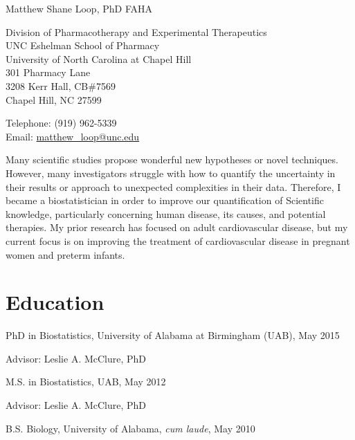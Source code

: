 \documentclass[10pt,letterpaper]{article}
\def\name{Matthew Shane Loop, PhD FAHA}
\renewenvironment{itemize}{
  \begin{list}{}{
    \setlength{\leftmargin}{1.5em}
    \setlength{\itemsep}{0.25em}
    \setlength{\parskip}{0pt}
    \setlength{\parsep}{0.25em}
  }
}{
  \end{list}
}
\begin{document}
{\Huge \name}


\bigskip

\begin{minipage}[t]{0.6\textwidth}
  Division of Pharmacotherapy and Experimental Therapeutics \\
  UNC Eshelman School of Pharmacy\\
  University of North Carolina at Chapel Hill\\
  301 Pharmacy Lane\\
  3208 Kerr Hall, CB\#7569 \\
  Chapel Hill, NC 27599
\end{minipage}
\begin{minipage}[t]{0.5\textwidth}
  Telephone: (919) 962-5339\\
  Email: \href{mailto:matthew\_loop@unc.edu}{matthew\_loop@unc.edu} \\
\end{minipage}

\bigskip

Many scientific studies propose wonderful new hypotheses or novel techniques. However, many investigators struggle with how to quantify the uncertainty in their results or approach to unexpected complexities in their data. Therefore, I became a biostatistician in order to improve our quantification of Scientific knowledge, particularly concerning human disease, its causes, and potential therapies. My prior research has focused on adult cardiovascular disease, but my current focus is on improving the treatment of cardiovascular disease in pregnant women and preterm infants.

\section*{Education}

\begin{itemize}
	\item PhD in Biostatistics, University of Alabama at Birmingham (UAB), May 2015
		\begin{itemize}
			\item Advisor: Leslie A. McClure, PhD
		\end{itemize}
	\item M.S. in Biostatistics, UAB, May 2012
		\begin{itemize}
			\item Advisor: Leslie A. McClure, PhD
		\end{itemize}
  	\item B.S. Biology, University of Alabama, \textit{cum laude}, May 2010
\end{itemize}
\end{document}
